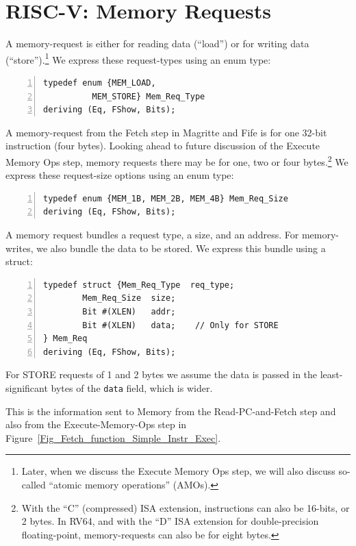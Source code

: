 
\section{RISC-V: Memory Requests}


A memory-request is either for reading data (``load'') or for writing
data (``store'').\footnote{Later, when we discuss the Execute Memory
Ops step, we will also discuss so-called ``atomic memory operations''
(AMOs).} We express these request-types using an enum type:

\begin{Verbatim}[frame=single, numbers=left]
typedef enum {MEM_LOAD,
	      MEM_STORE} Mem_Req_Type
deriving (Eq, FShow, Bits);
\end{Verbatim}

A memory-request from the Fetch step in Magritte and Fife is for one
32-bit instruction (four bytes). Looking ahead to future discussion of
the Execute Memory Ops step, memory requests there may be for one, two
or four bytes.\footnote{With the ``C'' (compressed) ISA extension,
instructions can also be 16-bits, or 2 bytes.  In RV64, and with the
``D'' ISA extension for double-precision floating-point,
memory-requests can also be for eight bytes.}  We express these
request-size options using an enum type:

\begin{Verbatim}[frame=single, numbers=left]
typedef enum {MEM_1B, MEM_2B, MEM_4B} Mem_Req_Size
deriving (Eq, FShow, Bits);
\end{Verbatim}

A memory request bundles a request type, a size, and an address.  For
memory-writes, we also bundle the data to be stored.  We express this
bundle using a struct:

\begin{Verbatim}[frame=single, numbers=left]
typedef struct {Mem_Req_Type  req_type;
		Mem_Req_Size  size;
		Bit #(XLEN)   addr;
		Bit #(XLEN)   data;    // Only for STORE
} Mem_Req
deriving (Eq, FShow, Bits);
\end{Verbatim}

For STORE requests of 1 and 2 bytes we assume the data is passed in
the least-significant bytes of the \verb|data| field, which is wider.

This is the information sent to Memory from the Read-PC-and-Fetch step
and also from the Execute-Memory-Ops step in
Figure~\ref{Fig_Fetch_function_Simple_Instr_Exec}.

